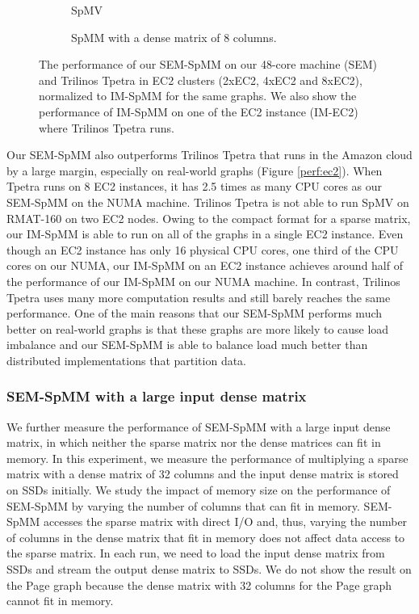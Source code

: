 \begin{figure}
	\footnotesize
	\centering
	\begin{subfigure}[b]{0.5\textwidth}
		\centering
		
		\vspace{-10pt}
		\caption{SpMV}
		\label{perf:spmv}
	\end{subfigure}
	\begin{subfigure}[b]{0.5\textwidth}
		\centering
		
		\vspace{-10pt}
		\caption{SpMM with a dense matrix of 8 columns.}
		\label{perf:spmm8}
	\end{subfigure}
	\vspace{3pt}
	\caption{The performance of our SEM-SpMM on our 48-core machine (SEM) and
		Trilinos Tpetra in EC2 clusters (2xEC2, 4xEC2 and 8xEC2), normalized to
		IM-SpMM for the same graphs. We also show the performance of IM-SpMM on
	one of the EC2 instance (IM-EC2) where Trilinos Tpetra runs.}
	\label{perf:spmm}
\end{figure}

Our SEM-SpMM also outperforms Trilinos Tpetra that runs in the Amazon cloud
by a large margin, especially on real-world graphs (Figure \ref{perf:ec2}).
When Tpetra runs on 8 EC2 instances, it has 2.5 times as many CPU cores as
our SEM-SpMM on the NUMA machine. Trilinos Tpetra is not able to run SpMV
on RMAT-160 on two EC2 nodes. Owing to the compact format for a sparse matrix,
our IM-SpMM is able to run on all of the graphs in a single EC2 instance.
Even though an EC2 instance has only 16 physical CPU cores, one third of
the CPU cores on our NUMA, our IM-SpMM on an EC2 instance achieves around
half of the performance of our IM-SpMM on our NUMA machine. In contrast,
Trilinos Tpetra uses many more computation results and still barely reaches
the same performance. One of the main reasons that our SEM-SpMM performs much
better on real-world graphs is that these graphs are more likely to cause
load imbalance and our SEM-SpMM is able to balance load much better than
distributed implementations that partition data.

\subsubsection{SEM-SpMM with a large input dense matrix}

We further measure the performance of SEM-SpMM with a large input dense matrix,
in which neither the sparse matrix nor the dense matrices can fit in memory.
In this experiment, we measure the performance of multiplying a sparse matrix
with a dense matrix of 32 columns and the input dense matrix is stored on SSDs
initially. We study the impact of memory size on the performance of SEM-SpMM
by varying the number of columns that can fit in memory. SEM-SpMM accesses
the sparse matrix with direct I/O and, thus, varying the number of columns
in the dense matrix that fit in memory does not affect data access to the
sparse matrix. In each run, we need to load the input dense matrix from
SSDs and stream the output dense matrix to SSDs. We do not show the result on
the Page graph because the dense matrix with 32 columns for the Page graph
cannot fit in memory.

